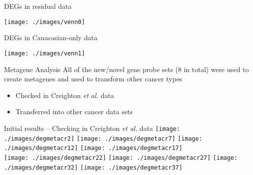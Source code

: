 \documentclass[handout]{beamer}
\begin{document}
\begin{frame}{DEGs in residual data}
	\begin{center}
		\texttt{[image: ./images/venn0]}
	\end{center}
\end{frame}


\begin{frame}{DEGs in Cauacasian-only data}
	\begin{center}
		\texttt{[image: ./images/venn1]}
	\end{center}
\end{frame}

\begin{frame}{Metagene Analysis}
	All of the new/novel gene probe sets (8 in total) were used to create metagenes and used to transform other cancer types
	\begin{itemize}
		\item Checked in Creighton \textit{et al.} data
		\item Transferred into other cancer data sets
	\end{itemize}
\end{frame}

\begin{frame}{Initial results -- Checking in Creighton \textit{et al.} data}
	\texttt{[image: ./images/degmetacr2]}
	\texttt{[image: ./images/degmetacr7]}
	\texttt{[image: ./images/degmetacr12]}
	\texttt{[image: ./images/degmetacr17]}\\
	\texttt{[image: ./images/degmetacr22]}
	\texttt{[image: ./images/degmetacr27]}
	\texttt{[image: ./images/degmetacr32]}
	\texttt{[image: ./images/degmetacr37]}
\end{frame}
\end{document}
